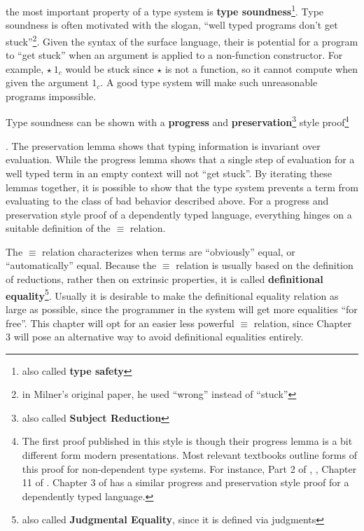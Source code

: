the most important property of a type system is \textbf{type soundness}\footnote{also called \textbf{type safety}}.
Type soundness is often motivated with the slogan, ``well typed programs
don't get stuck''\cite{MILNER1978348}\footnote{in Milner's original paper, he used ``wrong'' instead of ``stuck''}.
Given the syntax of the surface language, their is potential for a
program to ``get stuck'' when an argument is applied to a non-function
constructor. For example, $\star\ 1_{c}$ would be stuck since $\star$
is not a function, so it cannot compute when given the argument $1_{c}$.
A good type system will make such unreasonable programs impossible.

Type soundness can be shown with a \textbf{progress} and \textbf{preservation}\footnote{also called  \textbf{Subject Reduction}}
style proof\cite{WRIGHT199438}\footnote{The first proof published in this style is \cite{WRIGHT199438} though
their progress lemma is a bit different form modern presentations.
Most relevant textbooks outline forms of this proof for non-dependent
type systems. For instance, Part 2 of \cite{pierce2002types}, \cite{KOKKE2020102440},
Chapter 11 of \cite{chlipala2017formal}. Chapter 3 of \cite{sjoberg2015dependently}
has a similar progress and preservation style proof for a dependently
typed language.}

. The preservation lemma shows that typing information is invariant
over evaluation. While the progress lemma shows that a single step
of evaluation for a well typed term in an empty context will not ``get
stuck''. By iterating these lemmas together, it is possible to show
that the type system prevents a term from evaluating to the class
of bad behavior described above. For a progress and preservation style
proof of a dependently typed language, everything hinges on a suitable
definition of the $\equiv$ relation.

The $\equiv$ relation characterizes when terms are ``obviously''
equal, or ``automatically'' equal. Because the $\equiv$ relation
is usually based on the definition of reductions, rather then on extrinsic
properties, it is called \textbf{definitional equality}\footnote{also called \textbf{Judgmental Equality}, since it is defined via
judgments}. Usually it is desirable to make the definitional equality relation
as large as possible, since the programmer in the system will get
more equalities ``for free''. This chapter will opt for an easier
less powerful $\equiv$ relation, since Chapter 3 will pose an alternative
way to avoid definitional equalities entirely.

